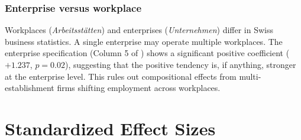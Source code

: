 \documentclass[12pt]{article}
\begin{document}
\subsubsection*{Enterprise versus workplace} Workplaces (\emph{Arbeitsst\"atten}) and enterprises (\emph{Unternehmen}) differ in Swiss business statistics. A single enterprise may operate multiple workplaces. The enterprise specification (Column 5 of ) shows a significant positive coefficient ($+1.237$, $p = 0.02$), suggesting that the positive tendency is, if anything, stronger at the enterprise level. This rules out compositional effects from multi-establishment firms shifting employment across workplaces.


\section{Standardized Effect Sizes}
\label{sec:sde}


\end{document}

